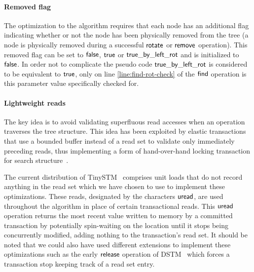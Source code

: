 \paragraph{Removed flag}
The optimization to the algorithm requires that each node has an additional flag indicating whether or not the 
node has been physically removed from the tree (a node is physically removed during a successful $\act{rotate}$ or $\act{remove}$ operation).
This removed flag can be set to $\lit{false}$, $\lit{true}$ or $\lit{true\_by\_left\_rot}$ and is initialized to $\lit{false}$.
In order not to complicate the pseudo code $\lit{true\_by\_left\_rot}$ is considered to be equivalent to $\lit{true}$, only on line \ref{line:find-rot-check} of the $\act{find}$ operation is this
parameter value specifically checked for.

\paragraph{Lightweight reads}
The key idea is to avoid validating superfluous read accesses when an operation traverses the tree structure.
This idea has been exploited by elastic transactions that use a bounded buffer instead of a read set to 
validate only immediately preceding reads, thus implementing a form of hand-over-hand locking transaction for 
search structure~\cite{FGG09}.

The current distribution of TinySTM~\cite{FFR08} comprises 
unit loads that do not record anything in the read set
which we have chosen to use to implement these optimizations.
These reads, designated by the characters $\act{uread}$, are used
throughout the algorithm in place of certain transactional reads.
This $\act{uread}$ operation returns the most recent value written to memory by a committed transaction by potentially spin-waiting on the location 
until it stops being concurrently modified, adding nothing to the transaction's read set.
It should be noted that we could also have used different extensions to implement these optimizations such as the early $\act{release}$ operation
of DSTM~\cite{HLMS03} which forces a transaction stop keeping track of a read set entry.

